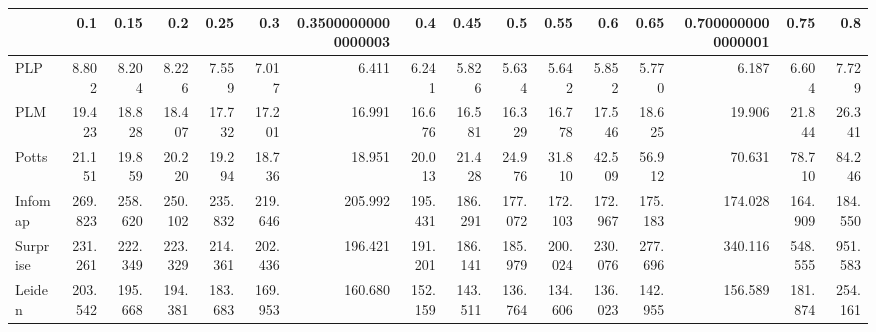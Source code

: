 \begin{tabular}{lrrrrrrrrrrrrrrr}
\toprule
{} &     0.1 &    0.15 &     0.2 &    0.25 &     0.3 & 0.35000000000000003 &     0.4 &    0.45 &     0.5 &    0.55 &     0.6 &    0.65 & 0.7000000000000001 &    0.75 &     0.8 \\
\midrule
PLP      &   8.802 &   8.204 &   8.226 &   7.559 &   7.017 &               6.411 &   6.241 &   5.826 &   5.634 &   5.642 &   5.852 &   5.770 &              6.187 &   6.604 &   7.729 \\
PLM      &  19.423 &  18.828 &  18.407 &  17.732 &  17.201 &              16.991 &  16.676 &  16.581 &  16.329 &  16.778 &  17.546 &  18.625 &             19.906 &  21.844 &  26.341 \\
Potts    &  21.151 &  19.859 &  20.220 &  19.294 &  18.736 &              18.951 &  20.013 &  21.428 &  24.976 &  31.810 &  42.509 &  56.912 &             70.631 &  78.710 &  84.246 \\
Infomap  & 269.823 & 258.620 & 250.102 & 235.832 & 219.646 &             205.992 & 195.431 & 186.291 & 177.072 & 172.103 & 172.967 & 175.183 &            174.028 & 164.909 & 184.550 \\
Surprise & 231.261 & 222.349 & 223.329 & 214.361 & 202.436 &             196.421 & 191.201 & 186.141 & 185.979 & 200.024 & 230.076 & 277.696 &            340.116 & 548.555 & 951.583 \\
Leiden   & 203.542 & 195.668 & 194.381 & 183.683 & 169.953 &             160.680 & 152.159 & 143.511 & 136.764 & 134.606 & 136.023 & 142.955 &            156.589 & 181.874 & 254.161 \\
\bottomrule
\end{tabular}
